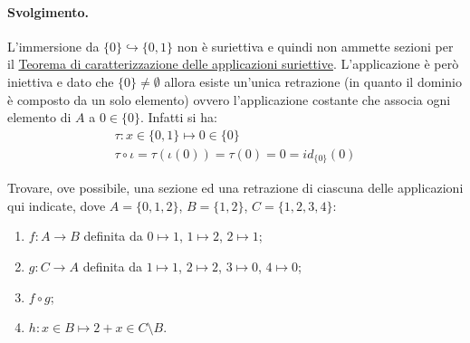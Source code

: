 \paragraph{Svolgimento.} L'immersione da $\{0\} \hookrightarrow \{0,1\}$ non è suriettiva e quindi non ammette sezioni per il \hyperlink{teor:car_sezioni}{Teorema di caratterizzazione delle applicazioni suriettive}. L'applicazione è però iniettiva e dato che $\{0\} \neq \emptyset$ allora esiste un'unica retrazione (in quanto il dominio è composto da un solo elemento) ovvero l'applicazione costante che associa ogni elemento di $A$ a $0 \in \{0\}$. Infatti si ha:
\begin{displaymath}
	\begin{array}{l}
		\tau : x \in \{0,1\} \mapsto 0 \in \{0\} \\
		\tau \circ \iota = \tau (\iota(0)) = \tau(0) = 0 = id_{\{0\}}(0)
	\end{array}
\end{displaymath}
\begin{flushright}
	\blacksquare
\end{flushright}
\begin{exsbox}
	Trovare, ove possibile, una sezione ed una retrazione di ciascuna delle applicazioni qui indicate, dove $A= \{0,1,2\}$, $B = \{1,2\}$, $C = \{1,2,3,4\}$:
	\begin{enumerate}
		\item $f: A \longrightarrow B$ definita da $0 \mapsto 1$, $1 \mapsto 2$, $2 \mapsto 1$;
		\item $g: C \longrightarrow A$ definita da $1 \mapsto 1$, $2 \mapsto 2$, $3 \mapsto 0$, $4 \mapsto 0$;
		\item $f \circ g$;
		\item $h: x \in B \mapsto 2+x \in C \setminus B$.
	\end{enumerate}
\end{exsbox}
